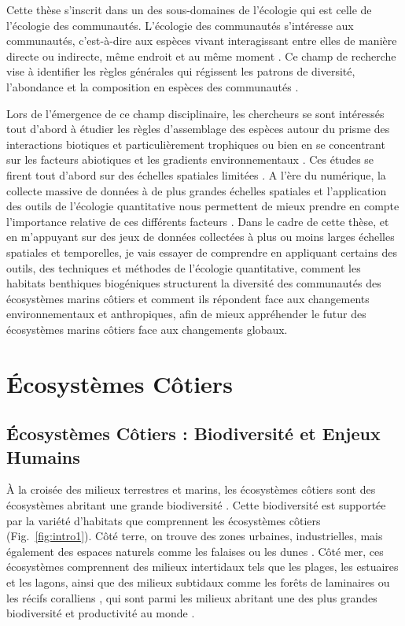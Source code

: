 \begin{refsection}
Cette thèse s'inscrit dans un des sous-domaines de l'écologie qui est
celle de l'écologie des communautés. L'écologie des communautés
s'intéresse aux communautés, c'est-à-dire aux espèces vivant
interagissant entre elles de manière directe ou indirecte, même endroit
et au même moment \autocite{Vellend_2017}. Ce champ de recherche vise à
identifier les règles générales qui régissent les patrons de diversité,
l'abondance et la composition en espèces des communautés
\autocite{Vellend_2010}.

Lors de l'émergence de ce champ disciplinaire, les chercheurs se sont
intéressés tout d'abord à étudier les règles d'assemblage des espèces
autour du prisme des interactions biotiques et particulièrement
trophiques ou bien en se concentrant sur les facteurs abiotiques et les
gradients environnementaux \autocite{Whittaker_1975}. Ces études se
firent tout d'abord sur des échelles spatiales limitées
\autocite{Whittaker_1960}. A l'ère du numérique, la collecte massive de
données à de plus grandes échelles spatiales et l'application des outils
de l'écologie quantitative nous permettent de mieux prendre en compte
l'importance relative de ces différents facteurs \autocite{Gaston_2000}.
Dans le cadre de cette thèse, et en m'appuyant sur des jeux de données
collectées à plus ou moins larges échelles spatiales et temporelles, je
vais essayer de comprendre en appliquant certains des outils, des
techniques et méthodes de l'écologie quantitative, comment les habitats
benthiques biogéniques structurent la diversité des communautés des
écosystèmes marins côtiers et comment ils répondent face aux changements
environnementaux et anthropiques, afin de mieux appréhender le futur des
écosystèmes marins côtiers face aux changements globaux.

\hypertarget{uxe9cosystuxe8mes-cuxf4tiers}{%
\section{Écosystèmes Côtiers}\label{uxe9cosystuxe8mes-cuxf4tiers}}

\hypertarget{uxe9cosystuxe8mes-cuxf4tiers-biodiversituxe9-et-enjeux-humains}{%
\subsection{Écosystèmes Côtiers : Biodiversité et Enjeux
Humains}\label{uxe9cosystuxe8mes-cuxf4tiers-biodiversituxe9-et-enjeux-humains}}

À la croisée des milieux terrestres et marins, les écosystèmes côtiers
sont des écosystèmes abritant une grande biodiversité
\autocite{ippc_chap6}. Cette biodiversité est supportée par la variété
d'habitats que comprennent les écosystèmes côtiers
(Fig.~\ref{fig:intro1}). Côté terre, on trouve des zones urbaines,
industrielles, mais également des espaces naturels comme les falaises ou
les dunes \autocite{Burke_2000}. Côté mer, ces écosystèmes comprennent
des milieux intertidaux tels que les plages, les estuaires et les
lagons, ainsi que des milieux subtidaux comme les forêts de laminaires
ou les récifs coralliens \autocite{Burke_2000}, qui sont parmi les
milieux abritant une des plus grandes biodiversité et productivité au
monde \autocite{Wernberg_2023}.


\end{refsection}
